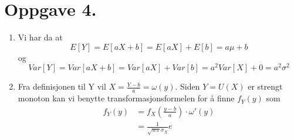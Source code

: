 \documentclass[a4paper,11pt,norsk]{article}
\begin{document}
\section*{Oppgave 4.}
\begin{enumerate}
    \item {
        Vi har da at 
        \[
            E[Y] = E[aX + b] = E[aX] + E[b] = a\mu + b
        \]
        og 
        \[
            Var[Y] = Var[aX + b] = Var[aX] + Var[b] = a^2Var[X] + 0 = a^2\sigma^2
        \]
    }
    \item {
        Fra definisjonen til Y vil $X = \frac{Y-b}{a} = \omega(y)$. Siden $Y = U(X)$ er strengt monoton
        kan vi benytte transformasjonsformelen for å finne $f_{Y}(y)$ som
        \begin{align*}
            f_Y(y) &= f_X(\frac{y-b}{a}) \cdot \omega'(y) \\ 
                   &= \frac{1}{\sqrt{w\pi}\sigma_X}e
        \end{align*}
    }
\end{enumerate}
\end{document}

